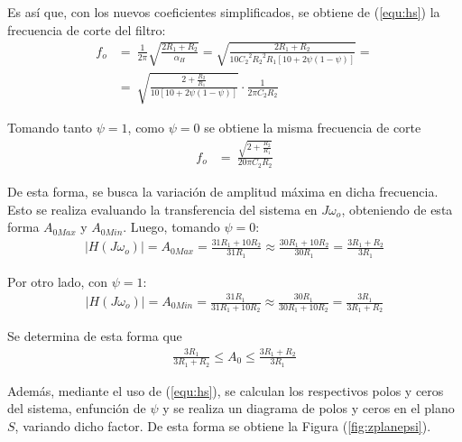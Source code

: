 \documentclass[a4paper]{article}
\begin{document}
Es así que, con los nuevos coeficientes simplificados, se obtiene de (\ref{equ:hs}) la frecuencia de corte del filtro:
\begin{equation}
\begin{split}
	f_o &=\ \frac{1}{2 \pi} \sqrt{\frac{2R_1 + R_2}{\alpha_H}} = \sqrt{\frac{2R_1 + R_2}{10 {C_{2}}^{2} {R_{2}}^{2} R_{1} \left[ 10 + 2 \psi \left(1 - \psi \right) \right]}} = \\
	&=\ \sqrt{\frac{2 + \frac{R_2}{R_1}}{10 \left[ 10 + 2 \psi \left(1 - \psi \right) \right]}} \cdot \frac{1}{2 \pi C_2 R_2}
\end{split}
\label{equ:fogeneral}
\end{equation}

Tomando tanto $\psi = 1$, como $\psi = 0$ se obtiene la misma frecuencia de corte
\begin{equation*}
\begin{split}
	f_o &=\ \frac{\sqrt{2 + \frac{R_2}{R_1}}}{20 \pi C_2 R_2}
\end{split}
\end{equation*}

De esta forma, se busca la variación de amplitud máxima en dicha frecuencia. Esto se realiza evaluando la transferencia del sistema en $J\omega_o$, obteniendo de esta forma $A_{0Max}$ y $A_{0Min}$. Luego, tomando $\psi = 0$:
\begin{equation*}
\begin{split}
|H\left(J\omega_o\right)| = A_{0Max} = \frac{31 R_{1} + 10 R_{2}}{31 R_{1}} \approx \frac{30 R_{1} + 10 R_{2}}{30 R_{1}} = \frac{3 R_{1} + R_{2}}{3 R_{1}}
\end{split}
\end{equation*}

Por otro lado, con $\psi = 1$:
\begin{equation*}
\begin{split}
|H\left(J\omega_o\right)| = A_{0Min} = \frac{31 R_{1}}{31 R_{1} + 10 R_{2}} \approx \frac{30 R_{1}}{30 R_{1} + 10 R_{2}} = \frac{3 R_{1}}{3 R_{1} + R_{2}}
\end{split}
\end{equation*}

Se determina de esta forma que
\begin{equation*}
\begin{split}
\frac{3 R_{1}}{3 R_{1} + R_{2}} \leq A_0 \leq \frac{3 R_{1} + R_{2}}{3 R_{1}}
\end{split}
\end{equation*}

Además, mediante el uso de (\ref{equ:hs}), se calculan los respectivos polos y ceros del sistema, enfunción de $\psi$ y se realiza un diagrama de polos y ceros en el plano $S$, variando dicho factor. De esta forma se obtiene la Figura (\ref{fig:zplanepsi}).
\end{document}
